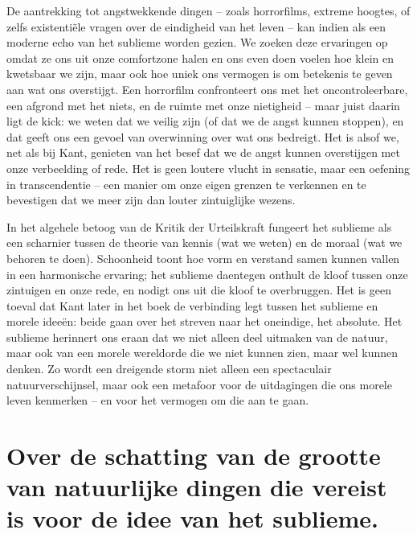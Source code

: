 \begin{mdframed}[leftmargin=0pt,rightmargin=0pt,backgroundcolor=blue!6,linecolor=white,innertopmargin=6pt,innerbottommargin=6pt]
De aantrekking tot angstwekkende dingen – zoals horrorfilms, extreme hoogtes, of zelfs existentiële vragen over de eindigheid van het leven – kan indien als een moderne echo van het sublieme worden gezien. We zoeken deze ervaringen op omdat ze ons uit onze comfortzone halen en ons even doen voelen hoe klein en kwetsbaar we zijn, maar ook hoe uniek ons vermogen is om betekenis te geven aan wat ons overstijgt. Een horrorfilm confronteert ons met het oncontroleerbare, een afgrond met het niets, en de ruimte met onze nietigheid – maar juist daarin ligt de kick: we weten dat we veilig zijn (of dat we de angst kunnen stoppen), en dat geeft ons een gevoel van overwinning over wat ons bedreigt. Het is alsof we, net als bij Kant, genieten van het besef dat we de angst kunnen overstijgen met onze verbeelding of rede. Het is geen loutere vlucht in sensatie, maar een oefening in transcendentie – een manier om onze eigen grenzen te verkennen en te bevestigen dat we meer zijn dan louter zintuiglijke wezens.

In het algehele betoog van de Kritik der Urteilskraft fungeert het sublieme als een scharnier tussen de theorie van kennis (wat we weten) en de moraal (wat we behoren te doen). Schoonheid toont hoe vorm en verstand samen kunnen vallen in een harmonische ervaring; het sublieme daentegen onthult de kloof tussen onze zintuigen en onze rede, en nodigt ons uit die kloof te overbruggen. Het is geen toeval dat Kant later in het boek de verbinding legt tussen het sublieme en morele ideeën: beide gaan over het streven naar het oneindige, het absolute. Het sublieme herinnert ons eraan dat we niet alleen deel uitmaken van de natuur, maar ook van een morele wereldorde die we niet kunnen zien, maar wel kunnen denken. Zo wordt een dreigende storm niet alleen een spectaculair natuurverschijnsel, maar ook een metafoor voor de uitdagingen die ons morele leven kenmerken – en voor het vermogen om die aan te gaan.

\end{mdframed}

\section{Over de schatting van de grootte van natuurlijke dingen die vereist is voor de idee van het sublieme.}

